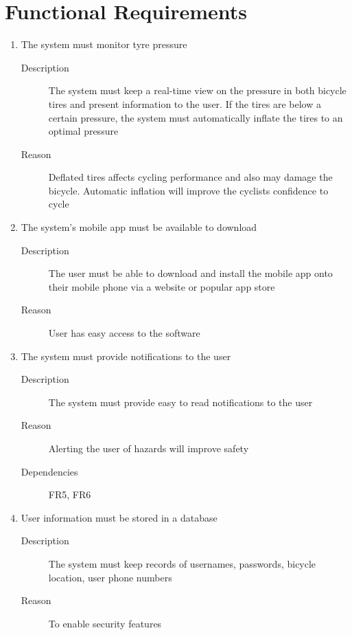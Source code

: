 \documentclass[a4paper]{report}
\begin{document}
\section{Functional Requirements}
\label{sec:func_req}
\begin{enumerate}[label=\ref*{sec:func_req}.\arabic*.,leftmargin=*]
\item The system must monitor tyre pressure
\begin{description}
\item[Description] The system must keep a real-time view on the pressure in both bicycle tires and present information to the user. If the tires are below a certain pressure, the system must automatically inflate the tires to an optimal pressure
\item[Reason] Deflated tires affects cycling performance and also may damage the bicycle. Automatic inflation will improve the cyclists confidence to cycle
\end{description}

\item The system's mobile app must be available to download
\begin{description}
\item[Description] The user must be able to download and install the mobile app onto their mobile phone via a website or popular app store
\item[Reason] User has easy access to the software
\end{description}

\item The system must provide notifications to the user
\begin{description}
\item[Description] The system must provide easy to read notifications to the user
\item[Reason] Alerting the user of hazards will improve safety
\item[Dependencies] FR5, FR6
\end{description}

\item User information must be stored in a database
\begin{description}
\item[Description] The system must keep records of usernames, passwords, bicycle location, user phone numbers
\item[Reason] To enable security features
\end{description}


\end{enumerate}
\end{document}

